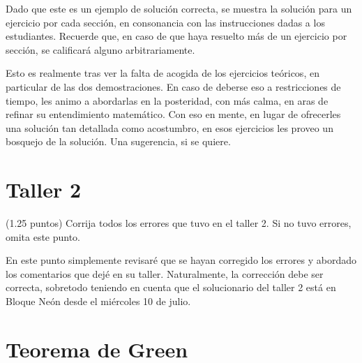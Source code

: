 \documentclass{fmbvecto}
\begin{document}
Dado que este es un ejemplo de solución correcta, se muestra la solución para un ejercicio por cada sección, en consonancia con las instrucciones dadas a los estudiantes. Recuerde que, en caso de que haya resuelto más de un ejercicio por sección, se calificará alguno arbitrariamente.

Esto es realmente tras ver la falta de acogida de los ejercicios teóricos, en particular de las dos demostraciones. En caso de deberse eso a restricciones de tiempo, les animo a abordarlas en la posteridad, con más calma, en aras de refinar su entendimiento matemático. Con eso en mente, en lugar de ofrecerles una solución tan detallada como acostumbro, en esos ejercicios les proveo un bosquejo de la solución. Una sugerencia, si se quiere.


\section{Taller 2}

\begin{problema}
    
    (1.25 puntos) Corrija todos los errores que tuvo en el taller 2. Si no tuvo errores, omita este punto.

    \tcblower
    
    En este punto simplemente revisaré que se hayan corregido los errores y abordado los comentarios que dejé en su taller. Naturalmente, la corrección debe ser correcta, sobretodo teniendo en cuenta que el solucionario del taller 2 está en Bloque Neón desde el miércoles 10 de julio.

\end{problema}

\section{Teorema de Green}
\end{document}
